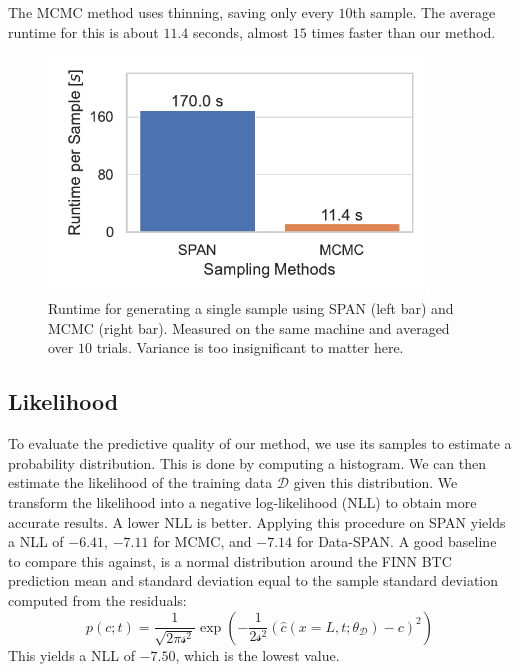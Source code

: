 The MCMC method uses thinning, saving only every $10$th sample. The average runtime for this is about $11.4$ seconds, almost $15$ times faster than our method.



\begin{figure}
    \centering
    \includegraphics[width=0.9\textwidth]{figs/runtime_per_sample.pdf}
    \caption{Runtime for generating a single sample using SPAN (left bar) and MCMC (right bar). Measured on the same machine and averaged over $10$ trials. Variance is too insignificant to matter here.}
    \label{fig:runtime_per_sample}
\end{figure}

\subsection{Likelihood}
\label{sec:likelihood}
To evaluate the predictive quality of our method, we use its samples to estimate a probability distribution. This is done by computing a histogram. We can then estimate the likelihood of the training data $\mathcal{D}$ given this distribution. We transform the likelihood into a negative log-likelihood (NLL) to obtain more accurate results. A lower NLL is better. Applying this procedure on SPAN yields a NLL of $-6.41$, $-7.11$ for MCMC, and $-7.14$ for Data-SPAN. A good baseline to compare this against, is a normal distribution around the FINN BTC prediction mean and standard deviation equal to the sample standard deviation computed from the residuals:
\begin{equation*}
    p(c; t) = \frac{1}{\sqrt{2 \pi \mathcal{s}^2}} \exp(-\frac{1}{2 \mathcal{s}^2} (\hat{c}(x=L, t; \theta_{\mathcal{D}}) - c)^2)
\end{equation*}
This yields a NLL of $-7.50$, which is the lowest value. %

